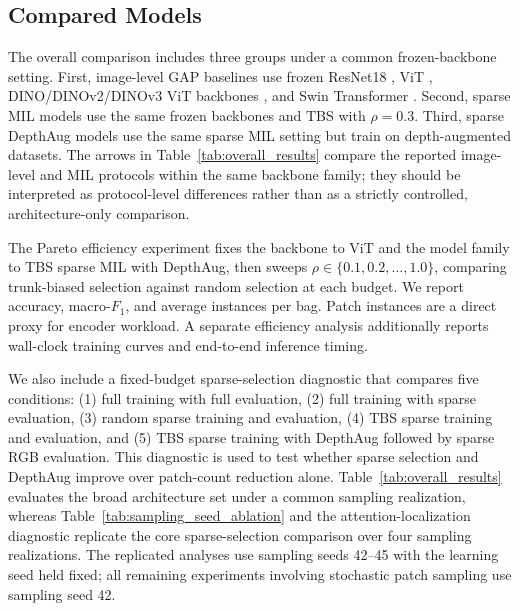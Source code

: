 \documentclass{ieeeaccess}
\begin{document}
\subsection{Compared Models}
The overall comparison includes three groups under a common frozen-backbone setting. First,
image-level GAP baselines use frozen ResNet18
\cite{resnet}, ViT \cite{vit}, DINO/DINOv2/DINOv3 ViT backbones \cite{dino,dinov2,dinov3}, and Swin
Transformer \cite{swin}. Second, sparse MIL models use the same frozen backbones and TBS with
$\rho=0.3$. Third, sparse DepthAug models use the same sparse MIL setting but train on
depth-augmented datasets.
The arrows in Table~\ref{tab:overall_results} compare the reported image-level and MIL protocols
within the same backbone family; they should be interpreted as protocol-level differences rather
than as a strictly controlled, architecture-only comparison.

The Pareto efficiency experiment fixes the backbone to ViT and the model family to TBS sparse MIL
with DepthAug, then sweeps $\rho \in \{0.1,0.2,\ldots,1.0\}$, comparing trunk-biased selection
against random selection at each budget. We report accuracy, macro-$F_1$, and average instances per
bag. Patch instances are a direct proxy for encoder workload. A separate efficiency analysis
additionally reports wall-clock training curves and end-to-end inference timing.

We also include a fixed-budget sparse-selection diagnostic that compares five conditions: (1) full
training with full evaluation, (2) full training with sparse evaluation, (3) random sparse training
and evaluation, (4) TBS sparse training and evaluation, and (5) TBS sparse training with DepthAug
followed by sparse RGB evaluation. This diagnostic is used to test whether sparse selection and
DepthAug improve over patch-count reduction alone. Table~\ref{tab:overall_results} evaluates the
broad architecture set under a common sampling realization, whereas
Table~\ref{tab:sampling_seed_ablation} and the attention-localization diagnostic replicate the core
sparse-selection comparison over four sampling realizations. The replicated analyses use sampling
seeds 42--45 with the learning seed held fixed; all remaining experiments involving stochastic
patch sampling use sampling seed 42.
\end{document}
